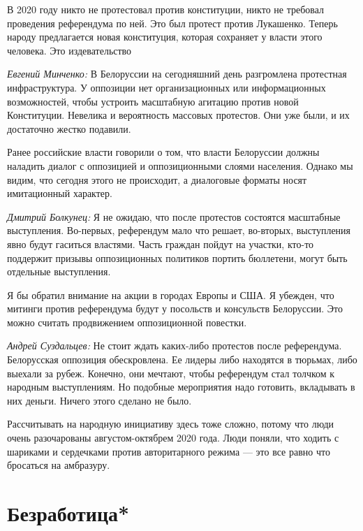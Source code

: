 \begin{fancyquotes}
    В 2020 году никто не протестовал против конституции, никто не требовал проведения референдума по ней. Это был протест против Лукашенко. Теперь народу предлагается новая конституция, которая сохраняет у власти этого человека. Это издевательство
\end{fancyquotes}

\textit{Евгений Минченко:} В Белоруссии на сегодняшний день разгромлена протестная инфраструктура. У оппозиции нет организационных или информационных возможностей, чтобы устроить масштабную агитацию против новой Конституции. Невелика и вероятность массовых протестов. Они уже были, и их достаточно жестко подавили.

Ранее российские власти говорили о том, что власти Белоруссии должны наладить диалог с оппозицией и оппозиционными слоями населения. Однако мы видим, что сегодня этого не происходит, а диалоговые форматы носят имитационный характер.

\textit{Дмитрий Болкунец:} Я не ожидаю, что после протестов состоятся масштабные выступления. Во-первых, референдум мало что решает, во-вторых, выступления явно будут гаситься властями. Часть граждан пойдут на участки, кто-то поддержит призывы оппозиционных политиков портить бюллетени, могут быть отдельные выступления.

Я бы обратил внимание на акции в городах Европы и США. Я убежден, что митинги против референдума будут у посольств и консульств Белоруссии. Это можно считать продвижением оппозиционной повестки.

\textit{Андрей Суздальцев:} Не стоит ждать каких-либо протестов после референдума. Белорусская оппозиция обескровлена. Ее лидеры либо находятся в тюрьмах, либо выехали за рубеж. Конечно, они мечтают, чтобы референдум стал толчком к народным выступлениям. Но подобные мероприятия надо готовить, вкладывать в них деньги. Ничего этого сделано не было.

Рассчитывать на народную инициативу здесь тоже сложно, потому что люди очень разочарованы августом-октябрем 2020 года. Люди поняли, что ходить с шариками и сердечками против авторитарного режима — это все равно что бросаться на амбразуру.

\clearpage


\section{Безработица*}


